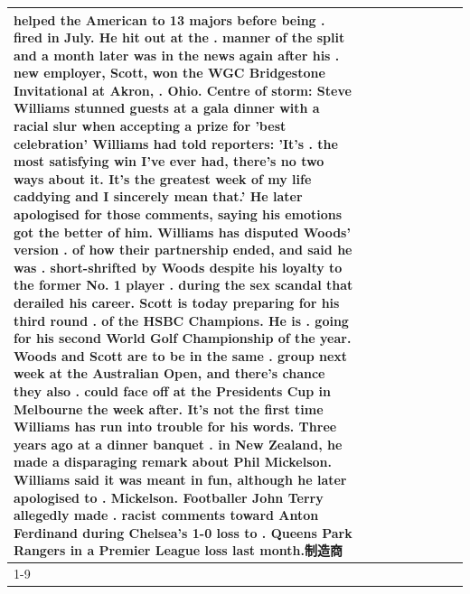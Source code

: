\begin{table}[H]
\begin{tabular}{lllrlllll}
helped the American to 13 majors before being . fired in July. He hit out at the . manner of the split and a month later was in the news again after his . new employer, Scott, won the WGC Bridgestone Invitational at Akron, . Ohio. Centre of storm: Steve Williams stunned guests at a gala dinner with a racial slur when accepting a prize for 'best celebration' Williams had told reporters: 'It's . the most satisfying win I've ever had, there's no two ways about it. It's the greatest week of my life caddying and I sincerely mean that.' He later apologised for those comments, saying his emotions got the better of him. Williams has disputed Woods' version . of how their partnership ended, and said he was . short-shrifted by Woods despite his loyalty to the former No. 1 player . during the sex scandal that derailed his career. Scott is today preparing for his third round . of the HSBC Champions. He is . going for his second World Golf Championship of the year. Woods and Scott are to be in the same . group next week at the Australian Open, and there's chance they also . could face off at the Presidents Cup in Melbourne the week after. It's not the first time Williams has run into trouble for his words. Three years ago at a dinner banquet . in New Zealand, he made a disparaging remark about Phil Mickelson. Williams said it was meant in fun, although he later apologised to . Mickelson. Footballer John Terry allegedly made . racist comments toward Anton Ferdinand during Chelsea's 1-0 loss to . Queens Park Rangers in a Premier League loss last month.制造商 \\
\cline{1-9}

\end{tabular}
\end{table}
